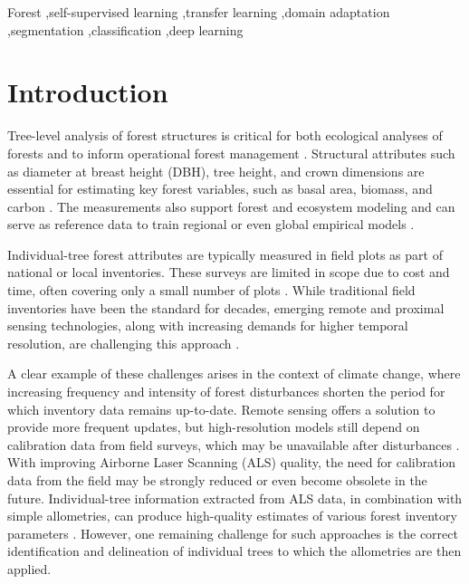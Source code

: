 \documentclass[review,authoryear]{elsarticle}
\begin{document}
\begin{frontmatter}
\begin{keyword}
Forest \sep self-supervised learning \sep transfer learning \sep domain adaptation \sep segmentation \sep classification \sep deep learning

\end{keyword}

\end{frontmatter}


\section{Introduction} 
\label{sec:intro}
Tree-level analysis of forest structures is critical for both ecological analyses of forests and to inform operational forest management \citep{10.1093/forestry/cpad024, NAESSET200288}. Structural attributes such as diameter at breast height (DBH), tree height, and crown dimensions are essential for estimating key forest variables, such as basal area, biomass, and carbon \citep{chave2014improved, salas2010modelling}. The measurements also support forest and ecosystem modeling and can serve as reference data to train regional or even global empirical models \citep{cao2016aboveground}.

Individual-tree forest attributes are typically measured in field plots as part of national or local inventories. These surveys are limited in scope due to cost and time, often covering only a small number of plots \citep{mcroberts2007remote}. While traditional field inventories have been the standard for decades, emerging remote and proximal sensing technologies, along with increasing demands for higher temporal resolution, are challenging this approach \citep{finger2025comparison,tompalski2019challenges}.

A clear example of these challenges arises in the context of climate change, where increasing frequency and intensity of forest disturbances shorten the period for which inventory data remains up-to-date. Remote sensing offers a solution to provide more frequent updates, but high-resolution models still depend on calibration data from field surveys, which may be unavailable after disturbances \citep{senf2017remote}. With improving Airborne Laser Scanning (ALS) quality, the need for calibration data from the field may be strongly reduced or even become obsolete in the future. Individual-tree information extracted from ALS data, in combination with simple allometries, can produce high-quality estimates of various forest inventory parameters \citep{LATIFI2015162,hyyppa2012advances}. However, one remaining challenge for such approaches is the correct identification and delineation of individual trees to which the allometries are then applied.
\end{document}
